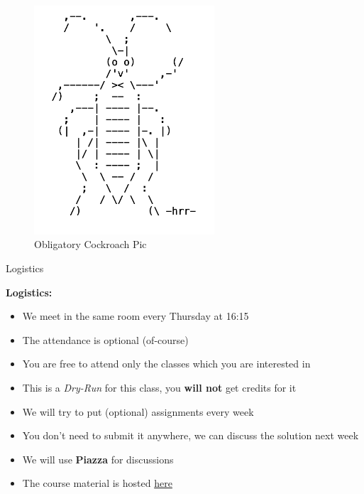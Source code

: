 \documentclass[aspectratio=169]{beamer}
\begin{document}
\begin{frame}{}
\begin{center}
\begin{columns}[T]
\end{columns}
\end{center}
\end{frame}

\begin{frame}{}
    \begin{center}
    \begin{figure}
        \includegraphics[width=0.6\textwidth, height=0.5\textwidth]{cockroach.png}
        \caption{Obligatory Cockroach Pic}
        \label{fig:cockroach}
    \end{figure}
    \end{center}
\end{frame}


\begin{frame}{Logistics}

\textbf{Logistics:}
\begin{itemize}    
        \item We meet in the same room every Thursday at 16:15
        \item The attendance is optional (of-course)
        \item You are free to attend only the classes which you are interested in
        \item This is a \textit{Dry-Run} for this class, you \textbf{will not} get credits for it
        \item We will try to put (optional) assignments every week
        \item You don't need to submit it anywhere, we can discuss the solution next week
        \item We will use \textbf{Piazza} for discussions
        \item The course material is hosted \href{https://github.com/pyRis/basic-tools-for-NLP}{here}
\end{itemize}

\end{frame}
\end{document}
